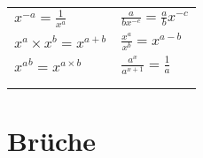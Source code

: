 \documentclass{report}
\begin{document}
\begin{tabularx}{1\textwidth} { 
    >{\centering\arraybackslash}X 
    >{\centering\arraybackslash}X  }
    \begin{math}
        x^{-a} = \frac{1}{x^a}
    \end{math}
    &
    \begin{math}
        \frac{a}{bx^{-c}} = \frac{a}{b}x^{-c}
    \end{math}
    \\ [7pt]
    \begin{math}
        x^a \times{x^b} = x^{a+b}
    \end{math}
    &
    \begin{math}
        \frac{x^a}{x^b} = x^{a-b}
    \end{math}
    \\ [7pt]
    \begin{math}
        {x^a}^b = x^{a \times{b}}
    \end{math}
    &
    \begin{math}
        \frac{a^x}{a^{x+1}} = \frac{1}{a}
    \end{math}
    \\ [7pt]
    \begin{math}
        {}
    \end{math}
    &
    \begin{math}
        {}
    \end{math}
    \\ [7pt]
    \begin{math}
        {}
    \end{math}
    &
    \begin{math}
        {}
    \end{math}
    \\ [7pt]
\end{tabularx}


\section{Brüche}
\end{document}
